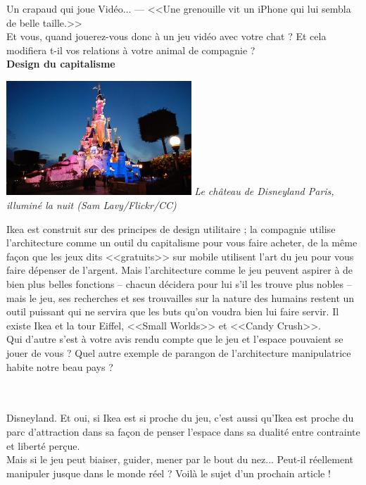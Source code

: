 \documentclass[11pt,twoside,a4paper]{article}
\begin{document}
Un crapaud qui joue {Vid{\'e}o}... --- <<Une grenouille vit un iPhone qui lui sembla de belle taille.>>~\\

Et vous, quand jouerez-vous donc {\`a} un jeu vid{\'e}o avec votre chat ? Et cela modifiera t-il vos relations {\`a} votre animal de compagnie ?~\\

\textbf{\large Design du capitalisme}~\\

\begin{minipage}[ht]{7.00cm}
	\includegraphics[width=6.95cm]{img/3620468272_02ffb32bfb_z-1_0.jpg}
	\emph{\footnotesize Le ch{\^a}teau de Disneyland Paris, illumin{\'e} la nuit (Sam Lavy/Flickr/CC)}~\\
\end{minipage} \hfill \begin{minipage}[ht]{0.65\textwidth}
	Ikea est construit sur des principes de design utilitaire ; la compagnie utilise l'architecture comme un outil du capitalisme pour vous faire acheter, de la m{\^e}me fa\c{c}on que les jeux dits <<gratuits>> sur mobile utilisent l'art du jeu pour vous faire d{\'e}penser de l'argent. Mais l'architecture comme le jeu peuvent aspirer {\`a} de bien plus belles fonctions -- chacun d{\'e}cidera pour lui s'il les trouve plus nobles -- mais le jeu, ses recherches et ses trouvailles sur la nature des humains restent un outil puissant qui ne servira que les buts qu'on voudra bien lui faire servir. Il existe Ikea et la tour Eiffel, <<Small Worlds>> et <<Candy Crush>>.~\\

	Qui d'autre s'est {\`a} votre avis rendu compte que le jeu et l'espace pouvaient se jouer de vous ? Quel autre exemple de parangon de l'architecture manipulatrice habite notre beau pays ?~\\
\end{minipage} ~\\~\\

Disneyland. Et oui, si Ikea est si proche du jeu, c'est aussi qu'Ikea est proche du parc d'attraction dans sa fa\c{c}on de penser l'espace dans sa dualit{\'e} entre contrainte et libert{\'e} per\c{c}ue.~\\

Mais si le jeu peut biaiser, guider, mener par le bout du nez... Peut-il r{\'e}ellement manipuler jusque dans le monde r{\'e}el ? Voil{\`a} le sujet d'un prochain article !~\\
\end{document}
